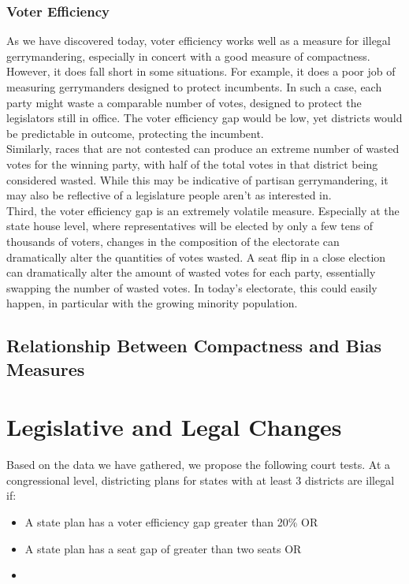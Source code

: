 \documentclass[12pt]{article}
\begin{document}
  \subsubsection{Voter Efficiency}
  As we have discovered today, voter efficiency works well as a measure for illegal gerrymandering, especially in concert with a good measure of compactness.  However, it does fall short in some situations.  For example, it does a poor job of measuring gerrymanders designed to protect incumbents.  In such a case, each party might waste a comparable number of votes, designed to protect the legislators still in office.  The voter efficiency gap would be low, yet districts would be predictable in outcome, protecting the incumbent.\\
  
  Similarly, races that are not contested can produce an extreme number of wasted votes for the winning party, with half of the total votes in that district being considered wasted.  While this may be indicative of partisan gerrymandering, it may also be reflective of a legislature people aren't as interested in.\\
  
  Third, the voter efficiency gap is an extremely volatile measure.  Especially at the state house level, where representatives will be elected by only a few tens of thousands of voters, changes in the composition of the electorate can dramatically alter the quantities of votes wasted.  A seat flip in a close election can dramatically alter the amount of wasted votes for each party, essentially swapping the number of wasted votes.  In today's electorate, this could easily happen, in particular with the growing minority population.
  
  \subsection{Relationship Between Compactness and Bias Measures}

  \section{Legislative and Legal Changes}
  
  Based on the data we have gathered, we propose the following court tests.  At a congressional level, districting plans for states with at least 3 districts are illegal if:
  \begin{itemize}
  \item A state plan has a voter efficiency gap greater than 20\% OR
  \item A state plan has a seat gap of greater than two seats OR
  \item%
  \end{itemize}
  
\end{document}

